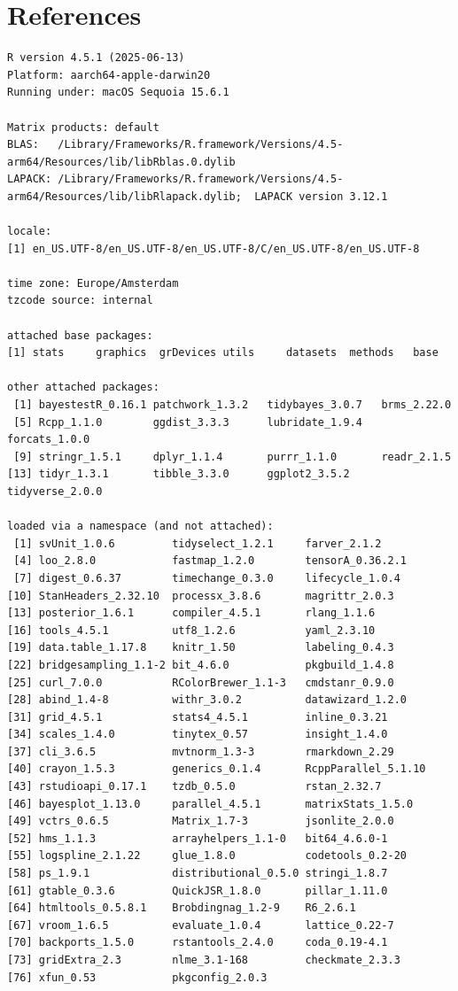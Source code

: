 \documentclass[
  doc,
  floatsintext,
  longtable,
  nolmodern,
  notxfonts,
  notimes,
  colorlinks=true,linkcolor=blue,citecolor=blue,urlcolor=blue]{apa7}
\begin{document}
\section{References}\label{references}

\begin{verbatim}
R version 4.5.1 (2025-06-13)
Platform: aarch64-apple-darwin20
Running under: macOS Sequoia 15.6.1

Matrix products: default
BLAS:   /Library/Frameworks/R.framework/Versions/4.5-arm64/Resources/lib/libRblas.0.dylib 
LAPACK: /Library/Frameworks/R.framework/Versions/4.5-arm64/Resources/lib/libRlapack.dylib;  LAPACK version 3.12.1

locale:
[1] en_US.UTF-8/en_US.UTF-8/en_US.UTF-8/C/en_US.UTF-8/en_US.UTF-8

time zone: Europe/Amsterdam
tzcode source: internal

attached base packages:
[1] stats     graphics  grDevices utils     datasets  methods   base     

other attached packages:
 [1] bayestestR_0.16.1 patchwork_1.3.2   tidybayes_3.0.7   brms_2.22.0      
 [5] Rcpp_1.1.0        ggdist_3.3.3      lubridate_1.9.4   forcats_1.0.0    
 [9] stringr_1.5.1     dplyr_1.1.4       purrr_1.1.0       readr_2.1.5      
[13] tidyr_1.3.1       tibble_3.3.0      ggplot2_3.5.2     tidyverse_2.0.0  

loaded via a namespace (and not attached):
 [1] svUnit_1.0.6         tidyselect_1.2.1     farver_2.1.2        
 [4] loo_2.8.0            fastmap_1.2.0        tensorA_0.36.2.1    
 [7] digest_0.6.37        timechange_0.3.0     lifecycle_1.0.4     
[10] StanHeaders_2.32.10  processx_3.8.6       magrittr_2.0.3      
[13] posterior_1.6.1      compiler_4.5.1       rlang_1.1.6         
[16] tools_4.5.1          utf8_1.2.6           yaml_2.3.10         
[19] data.table_1.17.8    knitr_1.50           labeling_0.4.3      
[22] bridgesampling_1.1-2 bit_4.6.0            pkgbuild_1.4.8      
[25] curl_7.0.0           RColorBrewer_1.1-3   cmdstanr_0.9.0      
[28] abind_1.4-8          withr_3.0.2          datawizard_1.2.0    
[31] grid_4.5.1           stats4_4.5.1         inline_0.3.21       
[34] scales_1.4.0         tinytex_0.57         insight_1.4.0       
[37] cli_3.6.5            mvtnorm_1.3-3        rmarkdown_2.29      
[40] crayon_1.5.3         generics_0.1.4       RcppParallel_5.1.10 
[43] rstudioapi_0.17.1    tzdb_0.5.0           rstan_2.32.7        
[46] bayesplot_1.13.0     parallel_4.5.1       matrixStats_1.5.0   
[49] vctrs_0.6.5          Matrix_1.7-3         jsonlite_2.0.0      
[52] hms_1.1.3            arrayhelpers_1.1-0   bit64_4.6.0-1       
[55] logspline_2.1.22     glue_1.8.0           codetools_0.2-20    
[58] ps_1.9.1             distributional_0.5.0 stringi_1.8.7       
[61] gtable_0.3.6         QuickJSR_1.8.0       pillar_1.11.0       
[64] htmltools_0.5.8.1    Brobdingnag_1.2-9    R6_2.6.1            
[67] vroom_1.6.5          evaluate_1.0.4       lattice_0.22-7      
[70] backports_1.5.0      rstantools_2.4.0     coda_0.19-4.1       
[73] gridExtra_2.3        nlme_3.1-168         checkmate_2.3.3     
[76] xfun_0.53            pkgconfig_2.0.3     
\end{verbatim}
\end{document}
